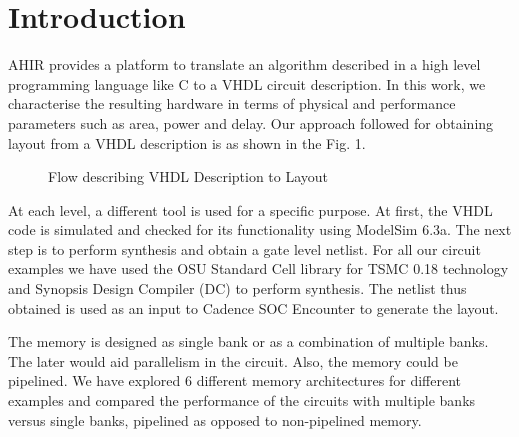 
\section{Introduction}
AHIR provides a platform to translate an algorithm described in a high level programming language like C to a VHDL circuit description. In this work, we characterise the resulting hardware in terms of physical and performance parameters such as area, power and delay. Our approach followed for obtaining layout from a VHDL description is as shown in the Fig. 1.


\begin{figure}[ht]
{\centering {} \par}
\caption{Flow describing VHDL Description to Layout}
\end{figure}

At each level, a different tool is used for a specific purpose. At first,  the VHDL code is simulated and checked for  its functionality using ModelSim 6.3a. The next step is  to perform synthesis and obtain a gate level netlist. For all our circuit examples we have used the OSU Standard Cell library for TSMC 0.18 technology and Synopsis  Design Compiler (DC) to perform synthesis. The netlist thus obtained is used as an input to Cadence SOC Encounter to generate the layout. 

The memory is designed as single bank or as a combination of multiple banks. The later would aid parallelism in the circuit. Also, the memory could be pipelined. We have explored 6 different memory architectures for different examples and compared the performance of the circuits with multiple banks versus single banks, pipelined as opposed to non-pipelined memory. 
